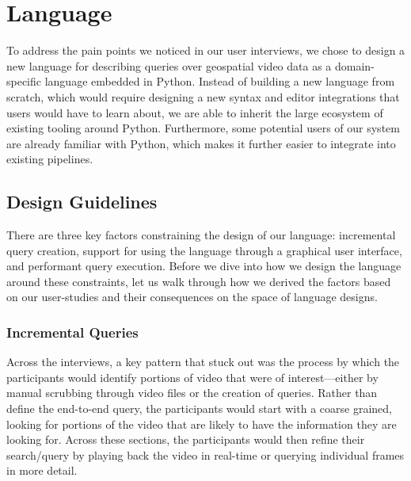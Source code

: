 
\section{Language}

To address the pain points we noticed in our user interviews, we chose to design a new language for describing queries over geospatial video data as a domain-specific language embedded in Python. Instead of building a new language from scratch, which would require designing a new syntax and editor integrations that users would have to learn about, we are able to inherit the large ecosystem of existing tooling around Python. Furthermore, some potential users of our system are already familiar with Python, which makes it further easier to integrate into existing pipelines.

\subsection{Design Guidelines}
There are three key factors constraining the design of our language: incremental query creation, support for using the language through a graphical user interface, and performant query execution. Before we dive into how we design the language around these constraints, let us walk through how we derived the factors based on our user-studies and their consequences on the space of language designs.

\subsubsection{Incremental Queries}
Across the interviews, a key pattern that stuck out was the process by which the participants would identify portions of video that were of interest---either by manual scrubbing through video files or the creation of queries. Rather than define the end-to-end query, the participants would start with a coarse grained, looking for portions of the video that are likely to have the information they are looking for. Across these sections, the participants would then refine their search/query by playing back the video in real-time or querying individual frames in more detail.

